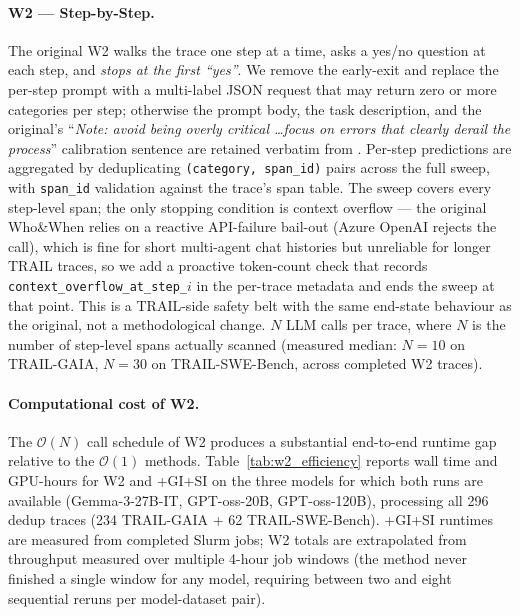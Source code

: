 \paragraph{W2 --- Step-by-Step.}
The original \textsc{W2} walks the trace one step at a time, asks a
yes/no question at each step, and \emph{stops at the first ``yes''}.
We remove the early-exit and replace the per-step prompt with a
multi-label JSON request that may return zero or more categories
per step; otherwise the prompt body, the task description, and the
original's ``\emph{Note: avoid being overly critical \ldots focus on
errors that clearly derail the process}'' calibration sentence are
retained verbatim from \citet{yin2025whoandwhen}. Per-step
predictions are aggregated by deduplicating
\texttt{(category, span\_id)} pairs across the full sweep, with
\texttt{span\_id} validation against the trace's span table. The
sweep covers every step-level span; the only stopping condition is
context overflow --- the original Who\&When relies on a reactive
API-failure bail-out (Azure OpenAI rejects the call), which is fine
for short multi-agent chat histories but unreliable for longer TRAIL
traces, so we add a proactive token-count check that records
\texttt{context\_overflow\_at\_step\_$i$} in the per-trace metadata
and ends the sweep at that point. This is a TRAIL-side safety belt
with the same end-state behaviour as the original, not a methodological
change. $N$ LLM calls per trace, where $N$ is the number of step-level
spans actually scanned (measured median: $N{=}10$ on TRAIL-GAIA,
$N{=}30$ on TRAIL-SWE-Bench, across completed \textsc{W2} traces).

\paragraph{Computational cost of \textsc{W2}.}
\label{app:w2_efficiency}
The $\mathcal{O}(N)$ call schedule of \textsc{W2} produces a
substantial end-to-end runtime gap relative to the $\mathcal{O}(1)$
methods.
Table~\ref{tab:w2_efficiency} reports wall time and GPU-hours for
\textsc{W2} and \textsc{+GI+SI} on the three models for which both
runs are available (Gemma-3-27B-IT, GPT-oss-20B, GPT-oss-120B),
processing all 296 dedup traces (234 TRAIL-GAIA + 62
TRAIL-SWE-Bench).
\textsc{+GI+SI} runtimes are measured from completed Slurm jobs;
\textsc{W2} totals are extrapolated from throughput measured over
multiple 4-hour job windows (the method never finished a single window
for any model, requiring between two and eight sequential reruns per
model-dataset pair).

